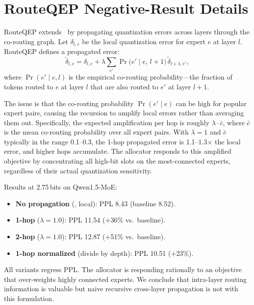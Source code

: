 \section{RouteQEP Negative-Result Details}
\label{app:routeqep}

RouteQEP extends \method\ by propagating quantization errors across layers through the co-routing graph. Let $\delta_{l,e}$ be the local quantization error for expert $e$ at layer $l$. RouteQEP defines a propagated error:
\begin{equation}
\tilde{\delta}_{l,e} = \delta_{l,e} + \lambda \sum_{e'} \Pr\!\bigl(e' \mid e,\, l{+}1\bigr)\, \tilde{\delta}_{l+1,e'},
\end{equation}
where $\Pr(e' \mid e, l)$ is the empirical co-routing probability---the fraction of tokens routed to $e$ at layer $l$ that are also routed to $e'$ at layer $l{+}1$.

The issue is that the co-routing probability $\Pr(e' \mid e)$ can be high for popular expert pairs, causing the recursion to amplify local errors rather than averaging them out. Specifically, the expected amplification per hop is roughly $\lambda \cdot \bar{c}$, where $\bar{c}$ is the mean co-routing probability over all expert pairs. With $\lambda\!=\!1$ and $\bar{c}$ typically in the range 0.1--0.3, the 1-hop propagated error is 1.1--1.3$\times$ the local error, and higher hops accumulate. The allocator responds to this amplified objective by concentrating all high-bit slots on the most-connected experts, regardless of their actual quantization sensitivity.

Results at 2.75\,bits on Qwen1.5-MoE:
\begin{itemize}
\item \textbf{No propagation} (\method, local): PPL 8.43 (baseline 8.52).
\item \textbf{1-hop} ($\lambda\!=\!1.0$): PPL 11.54 ($+$36\% vs.\ baseline).
\item \textbf{2-hop} ($\lambda\!=\!1.0$): PPL 12.87 ($+$51\% vs.\ baseline).
\item \textbf{1-hop normalized} (divide by depth): PPL 10.51 ($+$23\%).
\end{itemize}

All variants regress PPL. The allocator is responding rationally to an objective that over-weights highly connected experts. We conclude that intra-layer routing information is valuable but naive recursive cross-layer propagation is not with this formulation.
